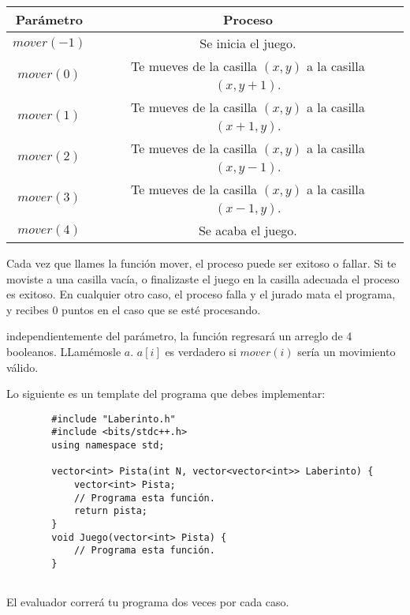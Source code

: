 \documentclass[12pt]{scrartcl}
\begin{document}
    \begin{center}
        \begin{tabular}{|c|c|}
            \hline
            {\bfseries Parámetro} & {\bfseries Proceso}\\
            \hline
             $mover(-1)$ & Se inicia el juego. \\
             \hline
             $mover(0)$ &  Te mueves de la casilla $(x, y)$ a la casilla $(x, y + 1)$. \\
             \hline
             $mover(1)$ & Te mueves de la casilla $(x, y)$ a la casilla $(x + 1, y)$.\\
             \hline
             $mover(2)$ & Te mueves de la casilla $(x, y)$ a la casilla $(x, y - 1)$.\\
             \hline
             $mover(3)$ & Te mueves de la casilla $(x, y)$ a la casilla $(x - 1, y)$.\\
             \hline
             $mover(4)$ & Se acaba el juego.\\
             \hline
        \end{tabular}
    \end{center}

    Cada vez que llames la función mover, el proceso puede ser exitoso o fallar.  Si te moviste a una casilla vacía, o finalizaste el juego en la casilla adecuada el proceso es exitoso. En cualquier otro caso, el proceso falla y el jurado mata el programa, y recibes 0 puntos en el caso que se esté procesando.
    
    
    independientemente del parámetro, la función regresará  un arreglo de 4 booleanos. LLamémosle $a$. $a[i]$ es verdadero si $mover(i)$ sería un movimiento válido. 
    
    Lo siguiente es un template del programa que debes implementar:
    
    \begin{verbatim}
        #include "Laberinto.h"
        #include <bits/stdc++.h>
        using namespace std;
        
        vector<int> Pista(int N, vector<vector<int>> Laberinto) {
            vector<int> Pista;
            // Programa esta función.
            return pista;
        }
        void Juego(vector<int> Pista) {
            // Programa esta función.
        }
        
    \end{verbatim}

    El evaluador correrá tu programa dos veces por cada caso.
\end{document}
